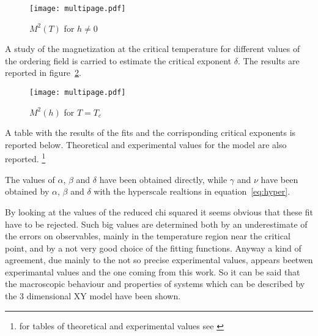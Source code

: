 \begin{figure}[H]
\centering                                       
\texttt{[image: multipage.pdf]}
\caption{$M^2 (T)$ for $h \neq 0$}                    
\label{fig:m2h}                               
\end{figure}                                     

A study of the magnetization at the critical temperature for different values of the
ordering field is carried to estimate the critical exponent $\delta$. The results are 
reported in figure~\ref{fig:m2hh}.

\begin{figure}[H] 
\centering 
\texttt{[image: multipage.pdf]}
\caption{$M^2 (h)$ for $T=T_c$}                    
\label{fig:m2hh}
\end{figure}                                     

A table with the results of the fits and the corrisponding critical exponents is
reported below. Theoretical and experimental values for the model are also 
reported. \footnote{for tables of theoretical and experimental values see \cite
{pathria1972statistical}}

\begin{table}[h]
\end{table}

The values of $\alpha$, $\beta$ and $\delta$ have been obtained directly, while $\gamma$
and $\nu$ have been obtained by $\alpha$, $\beta$ and $\delta$ with the hyperscale
realtions in equation~\ref{eq:hyper}.

By looking at the values of the reduced chi squared it seems obvious that these
fit have to be rejected. Such big values are determined both by an underestimate
of the errors on observables, mainly in the temperature region near the critical 
point, and by a not very good choice of the fitting functions. Anyway a kind of 
agreement, due mainly to the not so precise experimental values, appears beetwen 
experimantal values and the one coming from this work. So it can be said that
the macroscopic behaviour and properties of systems which can be described by the
3 dimensional XY model have been shown.
